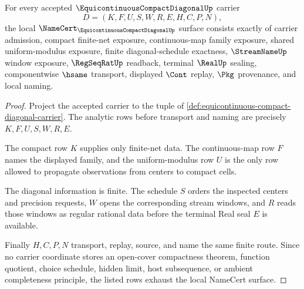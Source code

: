 \begin{theorem}
\label{thm:equicontinuous-compact-diagonal-namecert-obligations}
For every accepted $\EquicontinuousCompactDiagonalUp$ carrier
$$
D=(K,F,U,S,W,R,E,H,C,P,N),
$$
the local $\NameCert_{\EquicontinuousCompactDiagonalUp}$ surface consists exactly of carrier admission, compact finite-net exposure, continuous-map family exposure, shared uniform-modulus exposure, finite diagonal-schedule exactness, $\StreamNameUp$ window exposure, $\RegSeqRatUp$ readback, terminal $\RealUp$ sealing, componentwise $\hsame$ transport, displayed $\Cont$ replay, $\Pkg$ provenance, and local naming.
\end{theorem}
\begin{proof}
Project the accepted carrier to the tuple of \autoref{def:equicontinuous-compact-diagonal-carrier}. The analytic rows before transport and naming are precisely $K,F,U,S,W,R,E$.

The compact row $K$ supplies only finite-net data. The continuous-map row $F$ names the displayed family, and the uniform-modulus row $U$ is the only row allowed to propagate observations from centers to compact cells.

The diagonal information is finite. The schedule $S$ orders the inspected centers and precision requests, $W$ opens the corresponding stream windows, and $R$ reads those windows as regular rational data before the terminal Real seal $E$ is available.

Finally $H,C,P,N$ transport, replay, source, and name the same finite route. Since no carrier coordinate stores an open-cover compactness theorem, function quotient, choice schedule, hidden limit, host subsequence, or ambient completeness principle, the listed rows exhaust the local NameCert surface.
\end{proof}

